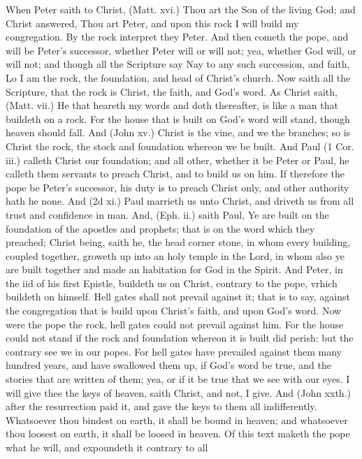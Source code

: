 When Peter saith to Christ, (Matt. xvi.) Thou art the 
Son of the living God; and Christ answered, Thou art 
Peter, and upon this rock I will build my congregation. 
By the rock interpret they Peter. And then cometh the 
pope, and will be Peter's successor, whether Peter will 
or will not; yea, whether God will, or will not; and though 
all the Scripture say Nay to any such succession, and faith, 
Lo I am the rock, the foundation, and head of Christ's 
church. Now saith all the Scripture, that the rock is 
Christ, the faith, and God's word. As Christ saith, 
(Matt. vii.) He that heareth my words and doth thereafter, 
is like a man that buildeth on a rock. For the house that 
is built on God's word will stand, though heaven should 
fall. And (John xv.) Christ is the vine, and we the 
branches; so is Christ the rock, the stock and foundation 
whereon we be built. And Paul (1 Cor. iii.) calleth 
Christ our foundation; and all other, whether it be Peter 
or Paul, he calleth them servants to preach Christ, and to 
build us on him. If therefore the pope be Peter's successor,
his duty is to preach Christ only, and other authority 
hath he none. And (2d xi.) Paul marrieth us unto 
Christ, and driveth us from all trust and confidence in man. 
And, (Eph. ii.) saith Paul, Ye are built on the foundation
of the apostles and prophets; that is on the word 
which they preached; Christ being, saith he, the head 
corner stone, in whom every building, coupled together, 
groweth up into an holy temple in the Lord, in whom also 
ye are built together and made an habitation for God in 
the Spirit. And Peter, in the iid of his first Epistle, buildeth 
us on Christ, contrary to the pope, vrhich buildeth on 
himself. Hell gates shall not prevail against it; that is to 
say, against the congregation that is build upon Christ's 
faith, and upon God's word. Now were the pope the 
rock, hell gates could not prevail against him. For the 
house could not stand if the rock and foundation whereon 
it is built did perish: but the contrary see we in our popes. 
For hell gates have prevailed against them many hundred 
years, and have swallowed them up, if God's word be 
true, and the stories that are written of them; yea, or if 
it be true that we see with our eyes. I will give thee the 
keys of heaven, saith Christ, and not, I give. And (John 
xxth.) after the resurrection paid it, and gave the keys to 
them all indifferently. Whatsoever thou bindest on earth, 
it shall be bound in heaven; and whatsoever thou loosest 
on earth, it shall be loosed in heaven. Of this text maketh 
the pope what he will, and expoundeth it contrary to all 
